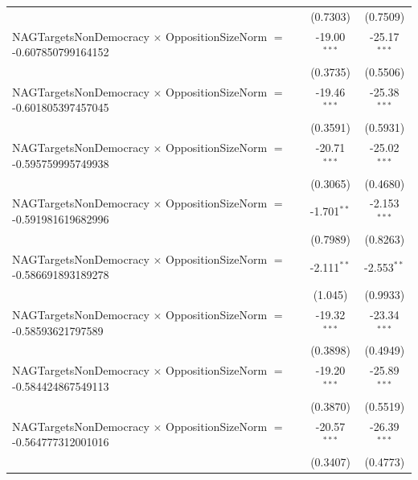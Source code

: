 \begin{tabular}{lcc}
                                                                                & (0.7303)             & (0.7509)\\   
   NAGTargetsNonDemocracy $\times$ OppositionSizeNorm $=$ -0.607850799164152    & -19.00$^{***}$       & -25.17$^{***}$\\   
                                                                                & (0.3735)             & (0.5506)\\   
   NAGTargetsNonDemocracy $\times$ OppositionSizeNorm $=$ -0.601805397457045    & -19.46$^{***}$       & -25.38$^{***}$\\   
                                                                                & (0.3591)             & (0.5931)\\   
   NAGTargetsNonDemocracy $\times$ OppositionSizeNorm $=$ -0.595759995749938    & -20.71$^{***}$       & -25.02$^{***}$\\   
                                                                                & (0.3065)             & (0.4680)\\   
   NAGTargetsNonDemocracy $\times$ OppositionSizeNorm $=$ -0.591981619682996    & -1.701$^{**}$        & -2.153$^{***}$\\   
                                                                                & (0.7989)             & (0.8263)\\   
   NAGTargetsNonDemocracy $\times$ OppositionSizeNorm $=$ -0.586691893189278    & -2.111$^{**}$        & -2.553$^{**}$\\   
                                                                                & (1.045)              & (0.9933)\\   
   NAGTargetsNonDemocracy $\times$ OppositionSizeNorm $=$ -0.58593621797589     & -19.32$^{***}$       & -23.34$^{***}$\\   
                                                                                & (0.3898)             & (0.4949)\\   
   NAGTargetsNonDemocracy $\times$ OppositionSizeNorm $=$ -0.584424867549113    & -19.20$^{***}$       & -25.89$^{***}$\\   
                                                                                & (0.3870)             & (0.5519)\\   
   NAGTargetsNonDemocracy $\times$ OppositionSizeNorm $=$ -0.564777312001016    & -20.57$^{***}$       & -26.39$^{***}$\\   
                                                                                & (0.3407)             & (0.4773)\\   

\end{tabular}
